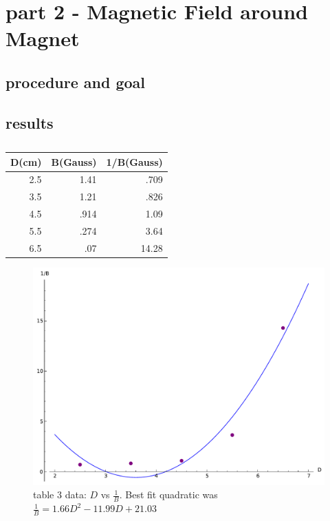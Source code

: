 \documentclass[12pt]{article}
\begin{document}
\section*{part 2 - Magnetic Field around Magnet}

\subsection*{procedure and goal}

\subsection*{results} 
	\begin{table}[h]
	\caption{}
	\centering
	\begin{tabular}{|r|r|r|}
	\hline 
	D(cm) & B(Gauss) & 1/B(Gauss) \\
	\hline 
	2.5 & 1.41 & .709 \\
	3.5 & 1.21 & .826 \\
	4.5 & .914 & 1.09 \\
	5.5 & .274 & 3.64 \\
	6.5 & .07 & 14.28 \\
	\hline
	\end{tabular}
	\end{table}

	\begin{figure}[hp]
	 \centering
	 \includegraphics[scale = .85]{plot3}
	 \caption*{table 3 data: $D$ vs $\frac{1}{B}$. Best fit quadratic was $ \frac{1}{B} = 1.66D^2  - 11.99D + 21.03 $}
	\end{figure} 
\end{document}
